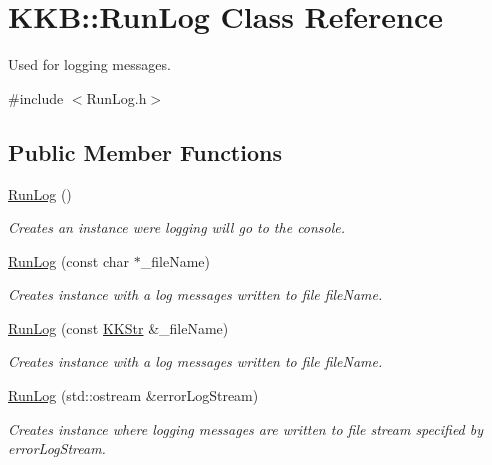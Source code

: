 \hypertarget{class_k_k_b_1_1_run_log}{}\section{K\+KB\+:\+:Run\+Log Class Reference}
\label{class_k_k_b_1_1_run_log}


Used for logging messages.  




{\ttfamily \#include $<$Run\+Log.\+h$>$}

\subsection*{Public Member Functions}
\begin{DoxyCompactItemize}
\item 
\hyperlink{class_k_k_b_1_1_run_log_aab85112fa394b9593c8db1c707993abd}{Run\+Log} ()
\begin{DoxyCompactList}\small\item\em Creates an instance were logging will go to the console. \end{DoxyCompactList}\item 
\hyperlink{class_k_k_b_1_1_run_log_abe78ec05ce09dd8444ae4554e7f3ae58}{Run\+Log} (const char $\ast$\+\_\+file\+Name)
\begin{DoxyCompactList}\small\item\em Creates instance with a log messages written to file \textquotesingle{}file\+Name\textquotesingle{}. \end{DoxyCompactList}\item 
\hyperlink{class_k_k_b_1_1_run_log_a53e496503fe2cad241233334373c1295}{Run\+Log} (const \hyperlink{class_k_k_b_1_1_k_k_str}{K\+K\+Str} \&\+\_\+file\+Name)
\begin{DoxyCompactList}\small\item\em Creates instance with a log messages written to file \textquotesingle{}file\+Name\textquotesingle{}. \end{DoxyCompactList}\item 
\hyperlink{class_k_k_b_1_1_run_log_aecaf0d0c6e24c07912c838fe24f25e43}{Run\+Log} (std\+::ostream \&error\+Log\+Stream)
\begin{DoxyCompactList}\small\item\em Creates instance where logging messages are written to file stream specified by \textquotesingle{}error\+Log\+Stream\textquotesingle{}. \end{DoxyCompactList}\item 

\end{DoxyCompactItemize}
